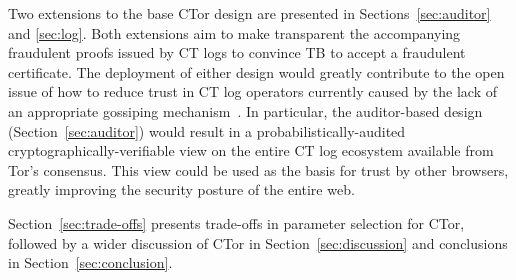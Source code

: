 Two extensions to the base CTor design are presented in
Sections~\ref{sec:auditor} and \ref{sec:log}. Both extensions aim to make
transparent the accompanying fraudulent proofs issued by CT logs to convince TB
to accept a fraudulent certificate. The deployment of either design would
greatly contribute to the open issue of how to reduce trust in CT log operators
currently caused by the lack of an appropriate gossiping mechanism~\cite{FIXME}.
In particular, the auditor-based design (Section~\ref{sec:auditor}) would result
in a probabilistically-audited cryptographically-verifiable view on the entire
CT log ecosystem available from Tor's consensus. This view could be used as the
basis for trust by other browsers, greatly improving the security posture of the
entire web.

Section~\ref{sec:trade-offs} presents trade-offs in parameter selection for
CTor, followed by a wider discussion of CTor in Section~\ref{sec:discussion} and
conclusions in Section~\ref{sec:conclusion}.
